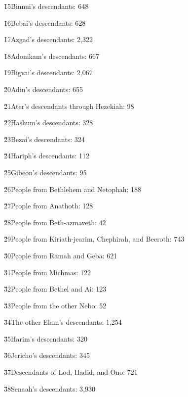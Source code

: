 \v{15}Binnui's descendants: 648

\v{16}Bebai's descendants: 628

\v{17}Azgad's descendants: 2,322

\v{18}Adonikam's descendants: 667

\v{19}Bigvai's descendants: 2,067

\v{20}Adin's descendants: 655

\v{21}Ater's descendants through Hezekiah: 98

\v{22}Hashum's descendants: 328

\v{23}Bezai's descendants: 324

\v{24}Hariph's descendants: 112

\v{25}Gibeon's descendants: 95

\v{26}People from Bethlehem and Netophah: 188

\v{27}People from Anathoth: 128

\v{28}People from Beth-azmaveth: 42

\v{29}People from Kiriath-jearim, Chephirah, and Beeroth: 743

\v{30}People from Ramah and Geba: 621

\v{31}People from Michmas: 122

\v{32}People from Bethel and Ai: 123

\v{33}People from the other Nebo: 52

\v{34}The other Elam's descendants: 1,254

\v{35}Harim's descendants: 320

\v{36}Jericho's descendants: 345

\v{37}Descendants of Lod, Hadid, and Ono: 721

\v{38}Senaah's descendants: 3,930


